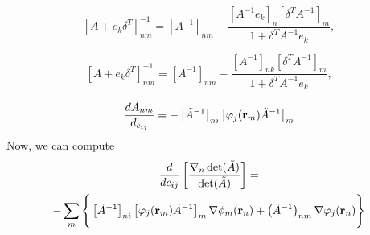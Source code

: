 \documentclass{article}
\begin{document}
\begin{equation}
\left[A + e_k\delta^T\right]^{-1}_{nm} = \left[A^{-1}\right]_{nm} - \frac{\left[A^{-1}e_k\right]_n\left[\delta^T
  A^{-1}\right]_m}{1 + \delta^T A^{-1}e_k},
\end{equation}

\begin{equation}
\left[A + e_k\delta^T\right]^{-1}_{nm} = \left[A^{-1}\right]_{nm} - \frac{\left[A^{-1}\right]_{nk}\left[\delta^T
  A^{-1}\right]_m}{1 + \delta^T A^{-1}e_k},
\end{equation}

\begin{equation}
\frac{d \tilde{A}_{nm}}{d_{c_{ij}}} =
-\left[\tilde{A}^{-1}\right]_{ni}\left[\varphi_j(\mathbf{r}_m)\tilde{A}^{-1}\right]_m 
\end{equation}
Now, we can compute
\begin{multline}
\frac{d}{dc_{ij}} \left[\frac{\nabla_n
    \det(\Aopt)}{\det(\Aopt)}\right] = \\ -\sum_m \left\{\rule{0cm}{0.6cm}
\left[\Aopt^{-1}\right]_{ni}\left[\varphi_j(\vr_m)\Aopt^{-1}\right]_m
\nabla \phi_m(\vr_n) +
\left(\Aopt^{-1}\right)_{nm} \nabla \varphi_j(\vr_n) \right\}
\end{multline}
\end{document}
